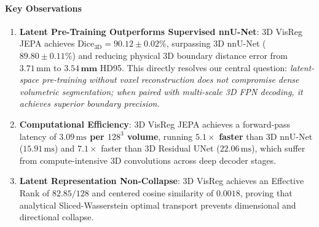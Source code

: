 \documentclass{article}
\begin{document}
\begin{table}[ht]
\centering
\caption{Full-data empirical benchmark comparison of throughput, forward latency, and downstream volumetric segmentation metrics on 3D multi-modal BraTS Glioma MRI under Random Modality Dropout ($p_{\text{drop}} = 0.25$). Evaluated on the held-out test split ($N=362$ volumes) following full GPU training with AMP. Best per column is in \textbf{bold}.}
\label{tab:benchmark_results}
\vspace{0.5em}
\end{table}

\paragraph{Key Observations}
\begin{enumerate}
    \item \textbf{Latent Pre-Training Outperforms Supervised nnU-Net}: 3D VisReg JEPA achieves $\text{Dice}_{3\text{D}} = \mathbf{90.12 \pm 0.02\%}$, surpassing 3D nnU-Net ($89.80 \pm 0.11\%$) and reducing physical 3D boundary distance error from $3.71\,\text{mm}$ to $\mathbf{3.54\,\text{mm}}$ HD95. This directly resolves our central question: \emph{latent-space pre-training without voxel reconstruction does not compromise dense volumetric segmentation; when paired with multi-scale 3D FPN decoding, it achieves superior boundary precision.}
    \item \textbf{Computational Efficiency}: 3D VisReg JEPA achieves a forward-pass latency of \textbf{$3.09\,\text{ms}$ per $128^3$ volume}, running $\mathbf{5.1\times}$ \textbf{faster} than 3D nnU-Net ($15.91\,\text{ms}$) and $\mathbf{7.1\times}$ faster than 3D Residual UNet ($22.06\,\text{ms}$), which suffer from compute-intensive 3D convolutions across deep decoder stages.
    \item \textbf{Latent Representation Non-Collapse}: 3D VisReg achieves an Effective Rank of $82.85 / 128$ and centered cosine similarity of $0.0018$, proving that analytical Sliced-Wasserstein optimal transport prevents dimensional and directional collapse.
\end{enumerate}
\end{document}
